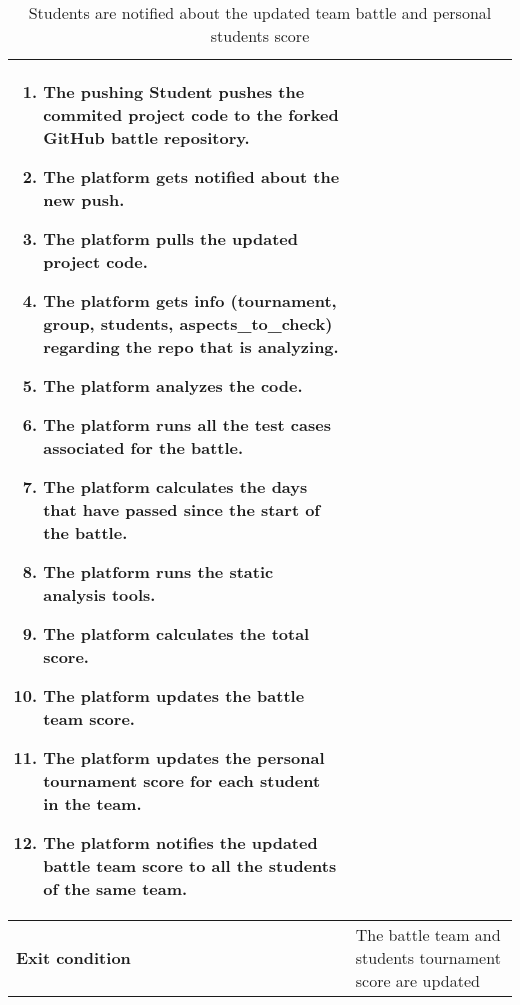 \begin{enumerate}[label=\textbf{UC\arabic*}:,ref=UC\arabic*,leftmargin=1.3cm]
{\begin{table}[H]
\begin{tabular}{|l|p{11.9cm}|}
\begin{enumerate}[label=\arabic*.]
                              \item The pushing Student pushes the commited project code to the forked GitHub battle repository.
                              \item The platform gets notified about the new push.
                              \item The platform pulls the updated project code.
                              \item The platform gets info (tournament, group, students, aspects_to_check) regarding the repo that is analyzing.
                              \item The platform analyzes the code.
                              \item The platform runs all the test cases associated for the battle.
                              \item The platform calculates the days that have passed since the start of the battle.
                              \item The platform runs the static analysis tools.
                              \item The platform calculates the total score.
                              \item The platform updates the battle team score.
                              \item The platform updates the personal tournament score for each student in the team.
                              \item The platform notifies the updated battle team score to all the students of the same team.
                        \end{enumerate}                                                       \\\hline
                        \textbf{Exit condition}  & The battle team and students tournament score are updated                                                                                    \\\hline
                  \end{tabular}
                  \caption{Students are notified about the updated team battle and personal students score}
                  \label{table:Students are notified about the updated team battle and personal students score}
            \end{table}
}
\end{enumerate}

